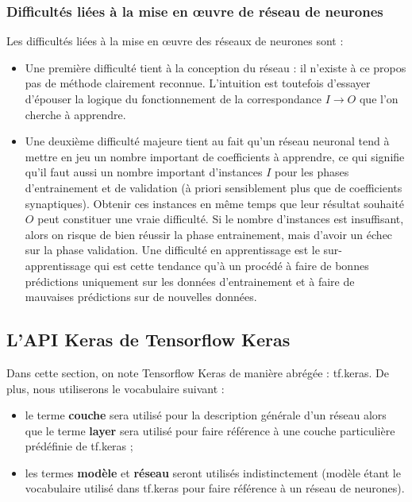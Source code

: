 \subsubsection{Difficultés liées à la mise en œuvre de réseau de neurones}

Les difficultés liées à la mise en œuvre des réseaux de neurones sont :
\begin{itemize}[label=$\square$]
	\item Une première difficulté tient à la conception du réseau : il n'existe à ce propos pas de méthode clairement reconnue. L'intuition est toutefois d'essayer d'épouser la logique du fonctionnement de la correspondance $I \rightarrow O$ que l'on cherche à apprendre.
	\item Une deuxième difficulté majeure tient au fait qu'un réseau neuronal tend à mettre en jeu un nombre important de coefficients à apprendre, ce qui signifie qu'il faut aussi un nombre important d'instances $I$ pour les phases d'entrainement et de validation (à priori sensiblement plus que de coefficients synaptiques). Obtenir ces instances en même temps que leur résultat souhaité $O$ peut constituer une vraie difficulté. Si le nombre d'instances est insuffisant, alors on risque de bien réussir la phase entrainement, mais d'avoir un échec sur la phase validation. Une difficulté en apprentissage est le sur-apprentissage qui est cette tendance qu'à un procédé à faire de bonnes prédictions uniquement sur les données d'entrainement et à faire de mauvaises prédictions sur de nouvelles données.
	
\end{itemize}

\subsection{L'API Keras de Tensorflow Keras}

Dans cette section, on note Tensorflow Keras de manière abrégée : tf.keras. De plus, nous utiliserons le vocabulaire suivant :

\begin{itemize}[label=$\square$]

	\item 	le terme \textbf{couche} sera utilisé pour la description générale d'un réseau alors que le terme \textbf{layer} sera utilisé pour faire référence à une couche particulière prédéfinie de tf.keras ;
	\item 	les termes \textbf{modèle} et \textbf{réseau} seront utilisés indistinctement (modèle étant le vocabulaire utilisé dans tf.keras pour faire référence à un réseau de neurones).
\end{itemize}

